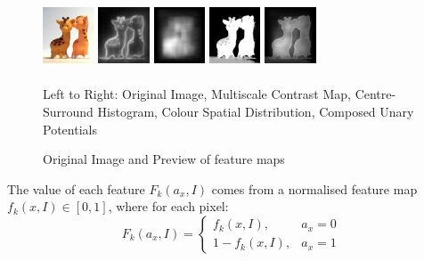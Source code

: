 \documentclass[10pt,twocolumn,letterpaper]{article}
\begin{document}
\begin{figure}
    \begin{center} %
    \includegraphics[width=0.6in,height=0.8in]{./Figures/previews/raw.jpg}
    \includegraphics[width=0.6in,height=0.8in]{./Figures/previews/MC.jpg}
    \includegraphics[width=0.6in,height=0.8in]{./Figures/previews/CSH.jpg} 
    \includegraphics[width=0.6in,height=0.8in]{./Figures/previews/CSD.jpg} 
    \includegraphics[width=0.6in,height=0.8in]{./Figures/previews/Composed.jpg} \\
    \caption{Original Image and Preview of feature maps}\vspace{1mm}
       \small Left to Right: Original Image, Multiscale Contrast Map, Centre-Surround Histogram, Colour Spatial Distribution, Composed Unary Potentials
\end{center}
\end{figure}

The value of each feature $F_k(a_x,I)$ comes from a normalised feature map $f_k(x,I)\in[0,1]$, where for each pixel: $$F_k(a_x,I) = \left\{\begin{matrix}f_k(x,I), & a_x=0\\1-f_k(x,I), & a_x=1\end{matrix}\right.$$
\end{document}
